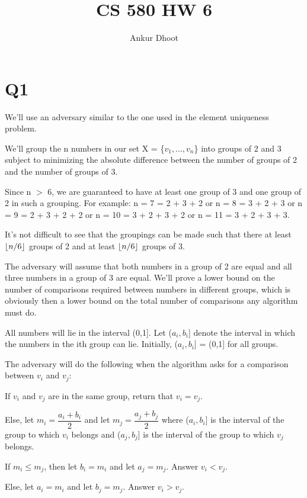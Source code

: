 \documentclass[11pt,a4paper]{article}
\DeclarePairedDelimiter\floor{\lfloor}{\rfloor}
\begin{document}
\author{Ankur Dhoot}
\title{CS 580 HW 6}
\maketitle

\section*{Q1}
We'll use an adversary similar to the one used in the element uniqueness problem. 

We'll group the n numbers in our set X = \{$v_{1},...,v_{n}$\} into groups of 2 and 3 subject to minimizing the absolute difference between the number of groups of 2 and the number of groups of 3.

Since n $>$ 6, we are guaranteed to have at least one group of 3 and one group of 2 in such a grouping. For example: n = 7 = 2 + 3 + 2 or n = 8 = 3 + 2 + 3 or n = 9 = 2 + 3 + 2 + 2 or n = 10 = 3 + 2 + 3 + 2 or n = 11 = 3 + 2 + 3 + 3.

It's not difficult to see that the groupings can be made such that there at least $\floor{n/6}$ groups of 2 and at least $\floor{n/6}$ groups of 3. 

The adversary will assume that both numbers in a group of 2 are equal and all three numbers in a group of 3 are equal. We'll prove a lower bound on the number of comparisons required between numbers in different groups, which is obviously then a lower bound on the total number of comparisons any algorithm must do. 

All numbers will lie in the interval (0,1]. Let ($a_{i}, b_{i}$] denote the interval in which the numbers in the ith group can lie. Initially, ($a_{i}, b_{i}$] = (0,1] for all groups.

The adversary will do the following when the algorithm asks for a comparison between $v_{i}$ and $v_{j}$:

If $v_{i}$ and $v_{j}$ are in the same group, return that $v_{i} = v_{j}$.

Else, let $m_{i} = \dfrac{a_{i} + b_{i}}{2}$ and let $m_{j} = \dfrac{a_{j} + b_{j}}{2}$ where ($a_{i}, b_{i}$] is the interval of the group to which $v_{i}$ belongs and ($a_{j}, b_{j}$] is the interval of the group to which $v_{j}$ belongs.

If $m_{i} \leq m_{j}$, then let $b_{i} = m_{i}$ and let $a_{j} = m_{j}$. Answer $v_{i} < v_{j}$.

Else, let $a_{i} = m_{i}$ and let $b_{j} = m_{j}$. Answer $v_{i} > v_{j}$. 
\end{document}
